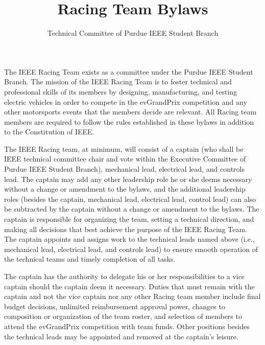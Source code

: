 \documentclass[12pt]{constitution}
\title{Racing Team Bylaws}
\author{Technical Committee of Purdue IEEE Student Branch}
\date{}
\begin{document}

\titlecontentspage
\newpage


\label{art:preamble}

The IEEE Racing Team exists as a committee under the Purdue IEEE Student Branch. The mission of the IEEE Racing Team is to foster technical and professional skills of its members by designing, manufacturing, and testing electric vehicles in order to compete in the evGrandPrix competition and any other motorsports events that the members decide are relevant. All Racing team members are required to follow the rules established in these bylaws in addition to the Constitution of IEEE.


\label{art:memlead}

The IEEE Racing team, at minimum, will consist of a captain (who shall be IEEE technical committee chair and vote within the Executive Committee of Purdue IEEE Student Branch), mechanical lead, electrical lead, and controls lead. The captain may add any other leadership role he or she deems necessary without a change or amendment to the bylaws, and the additional leadership roles (besides the captain, mechanical lead, electrical lead, control lead) can also be subtracted by the captain without a change or amendment to the bylaws. The captain is responsible for organizing the team, setting a technical direction, and making all decisions that best achieve the purpose of the IEEE Racing Team. The captain appoints and assigns work to the technical leads named above (i.e., mechanical lead, electrical lead, and controls lead) to ensure smooth operation of the technical teams and timely completion of all tasks.

The captain has the authority to delegate his or her responsibilities to a vice captain should the captain deem it necessary. Duties that must remain with the captain and not the vice captain nor any other Racing team member include final budget decisions, unlimited reimbursement approval power, changes to composition or organization of the team roster, and selection of members to attend the evGrandPrix competition with team funds. Other positions besides the technical leads may be appointed and removed at the captain’s leisure.
\end{document}
